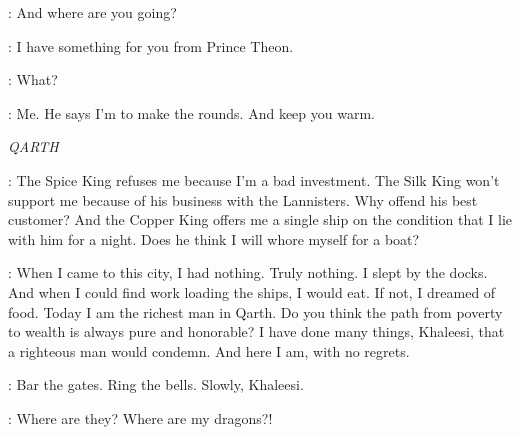 \DRENNAN: And where are you going? 

\OSHA: I have something for you from Prince Theon. 

\DRENNAN: What? 

\OSHA: Me. He says I'm to make the rounds. And keep you warm. 



\scene

\textit{QARTH} 


\DAENERYS: The Spice King refuses me because I'm a bad investment. The Silk King won't support me because of his business with the Lannisters. Why offend his best customer? And the Copper King offers me a single ship on the condition that I lie with him for a night. Does he think I will whore myself for a boat? 

\XARO: When I came to this city, I had nothing. Truly nothing. I slept by the docks. And when I could find work loading the ships, I would eat. If not, I dreamed of food. Today I am the richest man in Qarth. Do you think the path from poverty to wealth is always pure and honorable? I have done many things, Khaleesi, that a righteous man would condemn. And here I am, with no regrets. 


\XARO: Bar the gates. Ring the bells. Slowly, Khaleesi. 

\DAENERYS: Where are they? Where are my dragons?! 


